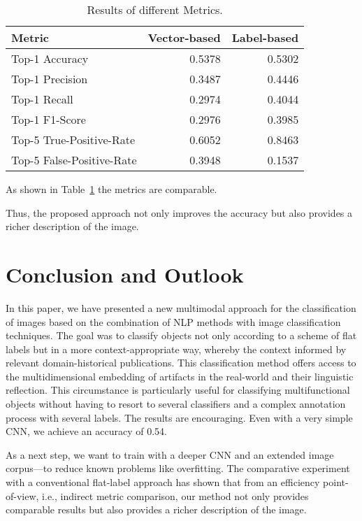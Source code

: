 \begin{table}
    \centering
    \begin{tabular}{lrr}
        \toprule
        Metric                     &   Vector-based &   Label-based \\ \midrule
        Top-1 Accuracy             &   \num{0.5378} &  \num{0.5302} \\
        Top-1 Precision            &   \num{0.3487} &  \num{0.4446} \\
        Top-1 Recall               &   \num{0.2974} &  \num{0.4044} \\
        Top-1 F1-Score             &   \num{0.2976} &  \num{0.3985} \\ \midrule
        Top-5 True-Positive-Rate   &   \num{0.6052} &  \num{0.8463} \\
        Top-5 False-Positive-Rate  &   \num{0.3948} &  \num{0.1537} \\
         \bottomrule
    \end{tabular}
    \caption{Results of different Metrics.}
    \label{tab:results}
\end{table}

As shown in Table~\ref{tab:results} the metrics are comparable.


Thus, the proposed approach not only improves the accuracy but also provides a richer description of the image.


\section{Conclusion and Outlook}
In this paper, we have presented a new multimodal approach for the classification of images based on the combination of NLP methods with image classification techniques. The goal was to classify objects not only according to a scheme of flat labels but in a more context-appropriate way, whereby the context informed by relevant domain-historical publications. This classification method offers access to the multidimensional embedding of artifacts in the real-world and their linguistic reflection. This circumstance is particularly useful for classifying multifunctional objects without having to resort to several classifiers and a complex annotation process with several labels. The results are encouraging. Even with a very simple  CNN, we achieve an accuracy of \num{0.54}.

As a next step, we want to train with a deeper CNN and an extended image corpus---to reduce known problems like overfitting. The comparative experiment with a conventional flat-label approach has shown that from an efficiency point-of-view, i.e., indirect metric comparison, our method not only provides comparable results but also provides a richer description of the image.


